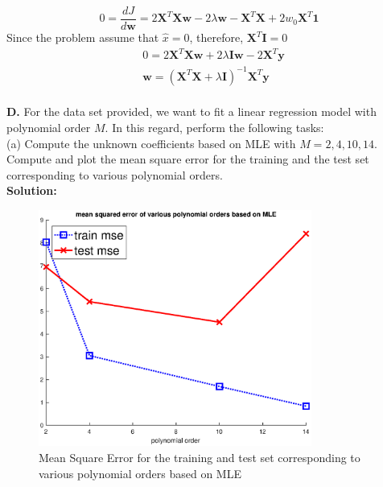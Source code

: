 \documentclass{article}
\newcommand{\widefigurewidth}{0.8\textwidth}
\begin{document}
\begin{equation}
    0 = \frac{d J}{ d \mathbf{w}} = 2 \mathbf{X}^{T} \mathbf{X} \mathbf{w} - 2\lambda \mathbf{w} - \mathbf{X}^{T} \mathbf{X} + 2 w_{0} \mathbf{X}^{T} \mathbf{1}
\end{equation}
Since the problem assume that $\hat{x} = 0$, therefore, $\mathbf{X}^{T} \mathbf{I}= 0$
\begin{equation}
\begin{aligned}
&0 = 2 \mathbf{X}^{T} \mathbf{X} \mathbf{w} + 2\lambda \mathbf{I} \mathbf{w} - 2\mathbf{X}^{T} \mathbf{y} \\
& \mathbf{w} = (\mathbf{X}^{T}\mathbf{X}+\lambda \mathbf{I})^{-1}\mathbf{X}^{T} \mathbf{y}
\end{aligned}
\end{equation}
\\
\textbf{D. } For the data set provided, we want to fit a linear regression model with polynomial order $M$. In this regard, perform the following tasks:
\\
(a) Compute the unknown coefficients based on MLE with $M = 2,4,10,14$. Compute and plot the mean square error for the training and the test set corresponding to various polynomial orders.\\
\textbf{Solution:}\\
\begin{figure}[h!]
\centering
\includegraphics[width=\widefigurewidth]{fig/P6da.eps}
\caption{Mean Square Error for the training and test set corresponding to various polynomial orders based on MLE}
\end{figure}\\
\end{document}
